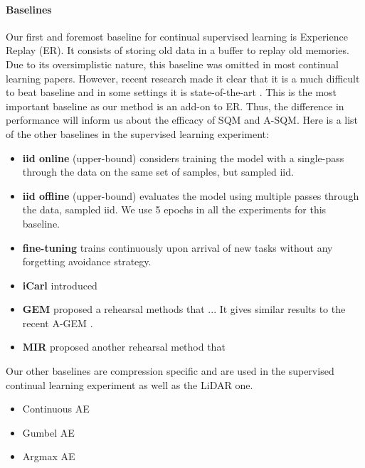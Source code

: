 \documentclass[colorinlistoftodos]{article} %
\begin{document}
\paragraph{Baselines}
Our first and foremost baseline for continual supervised learning is Experience Replay (ER). It consists of storing old data in a buffer to replay old memories. Due to its oversimplistic nature, this baseline was omitted in most continual learning papers. However, recent research made it clear that it is a much difficult to beat baseline and in some settings it is state-of-the-art \citep{chaudhry2019continual,aljundi2019online,aljundi2018Online} . This is the most important baseline as our method is an add-on to ER. Thus, the difference in performance will inform us about the efficacy of SQM and A-SQM. Here is a list of the other baselines in the supervised learning experiment:
\begin{itemize}
    \item \textbf{iid online} (upper-bound)
    considers training the model with a single-pass through the data on the same set of samples, but sampled iid.
    \item \textbf{iid offline} (upper-bound)
    evaluates the model using multiple passes through the data, sampled iid. We use 5 epochs in all the experiments for this baseline.
    \item \textbf{fine-tuning} 
    trains continuously upon arrival of new tasks without any forgetting avoidance strategy.
    \item \textbf{iCarl} \cite{rebuffi2017icarl} introduced 
    \item \textbf{GEM} \cite{lopez2017gradient} proposed a rehearsal methods that ... It gives similar results to the recent A-GEM \cite{chaudhry2018efficient}. 
    \item  \textbf{MIR} \cite{aljundi2019online} proposed another rehearsal method that 
\end{itemize}

Our other baselines are compression specific and are used in the supervised continual learning experiment as well as the LiDAR one. 


\begin{itemize}
    \item Continuous AE
    \item Gumbel AE
    \item Argmax AE
\end{itemize}
\end{document}
